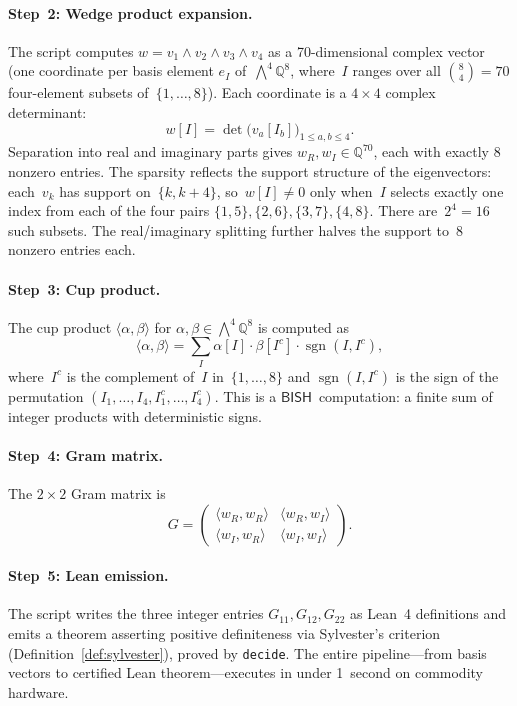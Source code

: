 \documentclass[11pt]{article}
\theoremstyle{plain}
\theoremstyle{definition}
\theoremstyle{remark}
\newcommand{\Q}{\mathbb{Q}}
\newcommand{\BISH}{\mathsf{BISH}}
\begin{document}
\paragraph{Step~2: Wedge product expansion.}
The script computes $w = v_1 \wedge v_2 \wedge v_3 \wedge v_4$ as a
70-dimensional complex vector (one coordinate per basis element
$e_I$ of~$\bigwedge^4\Q^8$, where~$I$ ranges over all
$\binom{8}{4} = 70$ four-element subsets of~$\{1,\ldots,8\}$).  Each
coordinate is a $4 \times 4$ complex determinant:
\[
  w[I] = \det\bigl(v_a[I_b]\bigr)_{1 \leq a,b \leq 4}.
\]
Separation into real and imaginary parts gives $w_R, w_I \in \Q^{70}$,
each with exactly 8 nonzero entries.  The sparsity reflects the support
structure of the eigenvectors: each~$v_k$ has support on~$\{k, k+4\}$,
so~$w[I] \neq 0$ only when~$I$ selects exactly one index from each of
the four pairs $\{1,5\}, \{2,6\}, \{3,7\}, \{4,8\}$.  There
are~$2^4 = 16$ such subsets.  The real/imaginary splitting further halves
the support to~$8$ nonzero entries each.

\paragraph{Step~3: Cup product.}
The cup product $\langle \alpha, \beta \rangle$ for
$\alpha, \beta \in \bigwedge^4 \Q^8$ is computed as
\[
  \langle \alpha, \beta \rangle
  = \sum_I \alpha[I] \cdot \beta[I^c] \cdot \operatorname{sgn}(I, I^c),
\]
where~$I^c$ is the complement of~$I$ in~$\{1,\ldots,8\}$ and
$\operatorname{sgn}(I,I^c)$ is the sign of the permutation
$(I_1,\ldots,I_4,I^c_1,\ldots,I^c_4)$.  This is a $\BISH$~computation:
a finite sum of integer products with deterministic signs.

\paragraph{Step~4: Gram matrix.}
The $2 \times 2$ Gram matrix is
\[
  G = \begin{pmatrix}
    \langle w_R, w_R \rangle & \langle w_R, w_I \rangle \\
    \langle w_I, w_R \rangle & \langle w_I, w_I \rangle
  \end{pmatrix}.
\]

\paragraph{Step~5: Lean emission.}
The script writes the three integer entries $G_{11}, G_{12}, G_{22}$
as Lean~4 definitions and emits a theorem asserting positive definiteness
via Sylvester's criterion (Definition~\ref{def:sylvester}), proved by
\texttt{decide}.  The entire pipeline---from basis vectors to
certified Lean theorem---executes in under 1~second on commodity hardware.
\end{document}
